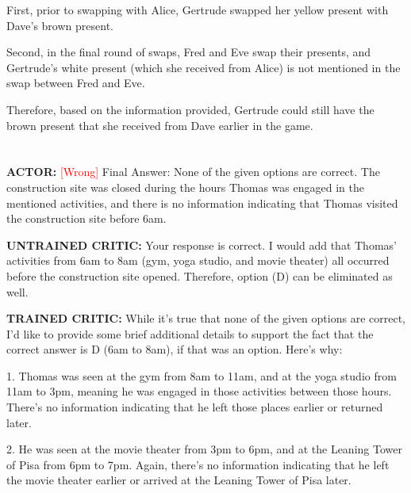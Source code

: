 First, prior to swapping with Alice, Gertrude swapped her yellow present with Dave's brown present.

Second, in the final round of swaps, Fred and Eve swap their presents, and Gertrude's white present (which she received from Alice) is not mentioned in the swap between Fred and Eve.

Therefore, based on the information provided, Gertrude could still have the brown present that she received from Dave earlier in the game.



\section*{}

\section*{}















\textbf{ACTOR:} \textcolor{red}{[Wrong]}
 Final Answer: None of the given options are correct. The construction site was closed during the hours Thomas was engaged in the mentioned activities, and there is no information indicating that Thomas visited the construction site before 6am.



\textbf{UNTRAINED CRITIC:}
 Your response is correct. I would add that Thomas' activities from 6am to 8am (gym, yoga studio, and movie theater) all occurred before the construction site opened. Therefore, option (D) can be eliminated as well.



\textbf{TRAINED CRITIC:}
 While it's true that none of the given options are correct, I'd like to provide some brief additional details to support the fact that the correct answer is D (6am to 8am), if that was an option. Here's why:

1. Thomas was seen at the gym from 8am to 11am, and at the yoga studio from 11am to 3pm, meaning he was engaged in those activities between those hours. There's no information indicating that he left those places earlier or returned later.

2. He was seen at the movie theater from 3pm to 6pm, and at the Leaning Tower of Pisa from 6pm to 7pm. Again, there's no information indicating that he left the movie theater earlier or arrived at the Leaning Tower of Pisa later.


